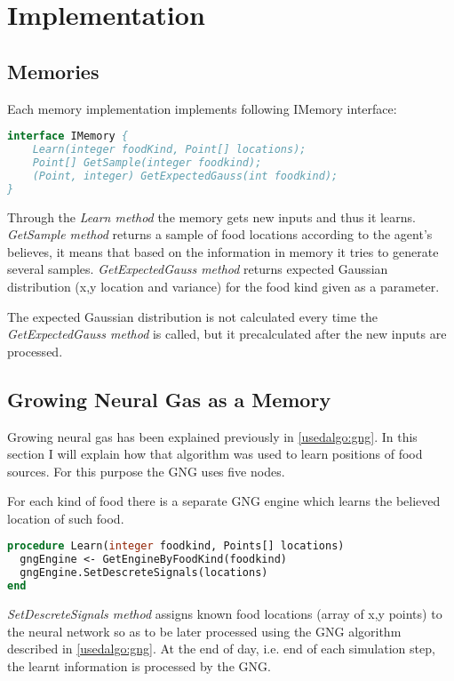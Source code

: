 \chapter{Implementation}

\section{Memories}

Each memory implementation implements following IMemory interface:

\begin{lstlisting}[language=Pascal]
interface IMemory {
	Learn(integer foodKind, Point[] locations);
	Point[] GetSample(integer foodkind);	
	(Point, integer) GetExpectedGauss(int foodkind);
}
\end{lstlisting}  

Through the \emph{Learn method} the memory gets new inputs and thus it learns. \emph{GetSample method} returns a sample of food locations according to the agent's believes, it means that based on the information in memory it tries to generate several samples. \emph{GetExpectedGauss method} returns expected Gaussian distribution (x,y location and variance) for the food kind given as a parameter.    

The expected Gaussian distribution is not calculated every time the \emph{GetExpectedGauss method} is called, but it precalculated after the new inputs are processed.

\section{Growing Neural Gas as a Memory}

Growing neural gas has been explained previously in \ref{usedalgo:gng}. In this section I will explain how that algorithm was used to learn positions of food sources. For this purpose the GNG uses five nodes.

For each kind of food there is a separate GNG engine which learns the believed location of such food. 

\begin{lstlisting}[language=Pascal]
procedure Learn(integer foodkind, Points[] locations)
  gngEngine <- GetEngineByFoodKind(foodkind)
  gngEngine.SetDescreteSignals(locations)
end
\end{lstlisting}  

\emph{SetDescreteSignals method} assigns known food locations (array of x,y points) to the neural network so as to be later processed using the GNG algorithm described in \ref{usedalgo:gng}. At the end of day, i.e. end of each simulation step, the learnt information is processed by the GNG.

